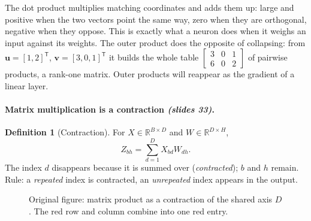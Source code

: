 \documentclass[11pt,a4paper]{article}
\newcommand{\R}{\mathbb{R}}
\newcommand{\T}{^{\mathsf{T}}}
\newcommand{\slides}[1]{\texorpdfstring{\emph{(slides #1)}}{(slides #1)}}
\theoremstyle{definition}
\newtheorem{definition}{Definition}[section]
\theoremstyle{plain}
\begin{document}
\begin{intuition}
The dot product multiplies matching coordinates and adds them up: large and positive when the two vectors point the same way, zero when they are orthogonal, negative when they oppose. This is exactly what a neuron does when it weighs an input against its weights. The outer product does the opposite of collapsing: from $\mathbf u=[1,2]\T$, $\mathbf v=[3,0,1]\T$ it builds the whole table $\begin{bmatrix}3&0&1\\6&0&2\end{bmatrix}$ of pairwise products, a rank-one matrix. Outer products will reappear as the gradient of a linear layer.
\end{intuition}

\paragraph{Matrix multiplication is a contraction \slides{33}.}
\begin{definition}[Contraction]
For $X\in\R^{B\times D}$ and $W\in\R^{D\times H}$,
\[
Z_{bh}=\sum_{d=1}^{D}X_{bd}W_{dh}.
\]
The index $d$ disappears because it is summed over (\emph{contracted}); $b$ and $h$ remain. Rule: a \emph{repeated} index is contracted, an \emph{unrepeated} index appears in the output.
\end{definition}

\begin{figure}[ht]
\centering
{}
\caption{Original figure: matrix product as a contraction of the shared axis $D$. The red row and column combine into one red entry.}
\end{figure}
\end{document}
